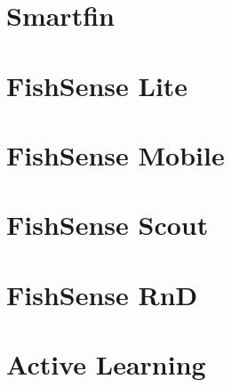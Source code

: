 \section{Smartfin}

\section{FishSense Lite}

\section{FishSense Mobile}

\section{FishSense Scout}

\section{FishSense RnD}

\section{Active Learning}

